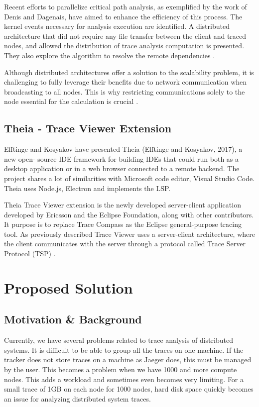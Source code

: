 Recent efforts to parallelize critical path analysis, as exemplified by the work of Denis and Dagenais, have aimed to enhance the efficiency of this process. The kernel events necessary for analysis execution are identified. A distributed architecture that did not require any file transfer between the client and traced nodes, and allowed the distribution of trace analysis computation is presented. They also explore the algorithm to resolve the remote dependencies \cite{matloff2011programming}.

Although distributed architectures offer a solution to the scalability problem, it is challenging to fully leverage their benefits due to network communication when broadcasting to all nodes. This is why restricting communications solely to the node essential for the calculation is crucial \cite{denys2023distributed}.


\subsection{Theia - Trace Viewer Extension}

Eﬀtinge and Kosyakov have presented Theia (Eﬀtinge and Kosyakov, 2017), a new open-
source IDE framework for building IDEs that could run both as a desktop application or in
a web browser connected to a remote backend. The project shares a lot of similarities with
Microsoft code editor, Visual Studio Code. Theia uses Node.js, Electron and implements
the LSP.


Theia Trace Viewer extension is the newly developed server-client application developed by Ericsson and the Eclipse Foundation, along with other contributors. It purpose is to replace Trace Compass as the Eclipse general-purpose tracing tool. As previously described Trace Viewer uses a server-client architecture, where the client communicates with the server through a protocol called Trace Server Protocol (TSP) \cite{desnoyers2006lttng}.

\section{Proposed Solution}


\subsection{Motivation \& Background}

Currently, we have several problems related to trace analysis of distributed systems. It is difficult to be able to group all the traces on one machine. If the tracker does not store traces on a machine as Jaeger does, this must be managed by the user. This becomes a problem when we have 1000 and more compute nodes. This adds a workload and sometimes even becomes very limiting. For a small trace of 1GB on each node for 1000 nodes, hard disk space quickly becomes an issue for analyzing distributed system traces.

